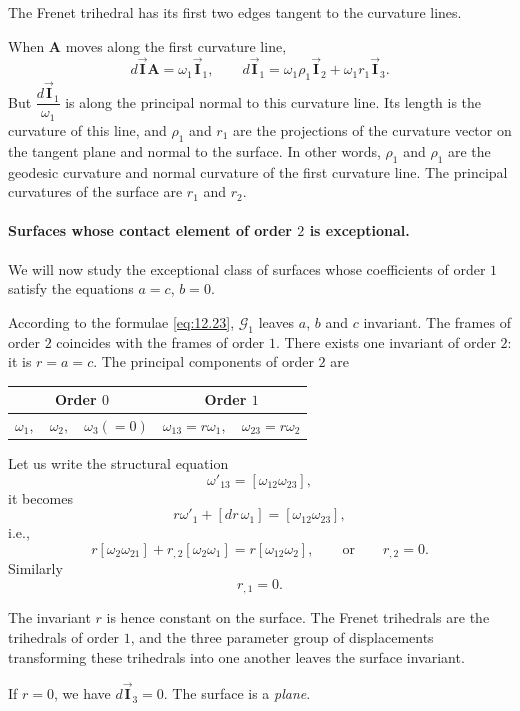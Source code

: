\documentclass[leqno,11pt]{book}
\numberwithin{equation}{chapter}
\theoremstyle{shape1}
\theoremstyle{shapesmall}
\newcommand{\rvec}[1]{\vec{\mathbf{#1}}}
\newcommand{\ivec}{\rvec{I}}
\begin{document}
The Frenet trihedral has its first two edges tangent to the curvature lines.

When $\mathbf{A}$ moves along the first curvature line,
\[
d\ivec{\mathbf{A}}=\omega_{1}\ivec_{1},\qquad d\ivec_{1}=\omega_{1}\rho_{1}\ivec_{2}+\omega_{1}r_{1}\ivec_{3}.
\]
But $\dfrac{d\ivec_{1}}{\omega_{1}}$ is along the principal normal to this curvature line. Its length is the curvature of this line, and $\rho_{1}$ and $r_{1}$ are the projections of the curvature vector on the tangent plane and normal to the surface. In other words, $\rho_{1}$ and $\rho_{1}$ are the geodesic curvature and normal curvature of the first curvature line. The principal curvatures of the surface are $r_{1}$ and $r_{2}$.

\paragraph{Surfaces whose contact element of order $2$ is exceptional.}
\label{sec:192}
We will now study the exceptional class of surfaces whose coefficients of order $1$ satisfy the equations $a=c$, $b=0$.

According to the formulae \eqref{eq:12.23}, $\mathcal{G}_{1}$ leaves $a$, $b$ and $c$ invariant. The frames of order $2$ coincides with the frames of order $1$. There exists one invariant of order $2$: it is $r=a=c$. The principal components of order $2$ are
\begin{center}  
\begin{tabular}{|c|c|}
  \hline
  Order $0$&Order $1$\\
  \hline
  $\omega_{1},\quad\omega_{2},\quad\omega_{3}(=0)$&$\omega_{13}=r\omega_{1},\quad\omega_{23}=r\omega_{2}$\\
  \hline
\end{tabular}
\end{center}
Let us write the structural equation
\[
\omega'_{13}=[\omega_{12}\omega_{23}],
\]
it becomes
\[
r\omega'_{1}+[dr\,\omega_{1}]=[\omega_{12}\omega_{23}],
\]
i.e.,
\[
r[\omega_{2}\omega_{21}]+r_{,2}[\omega_{2}\omega_{1}]=r[\omega_{12}\omega_{2}],\qquad\text{or}\qquad r_{,2}=0.
\]
Similarly
\[
r_{,1}=0.
\]

The invariant $r$ is hence constant on the surface. The Frenet trihedrals are the trihedrals of order $1$, and the three parameter group of displacements transforming these trihedrals into one another leaves the surface invariant.

If $r=0$, we have $d\ivec_{3}=0$. The surface is a \emph{plane}.
\end{document}
